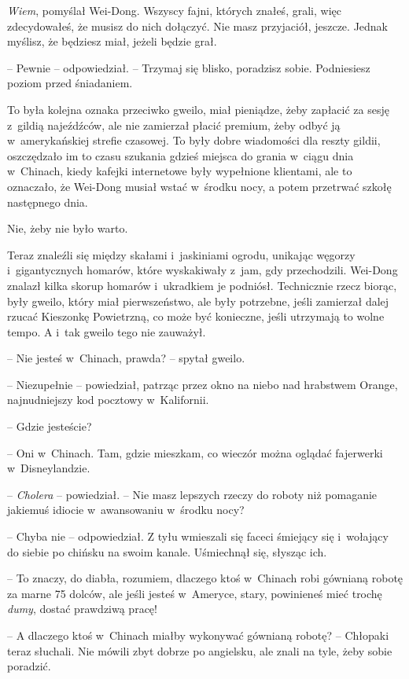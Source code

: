 \documentclass[oneside,polish,11pt,rmheadings]{mwbk}
\begin{document}
\textit{Wiem}, pomyślał Wei-Dong. Wszyscy fajni, których znałeś, grali, więc zdecydowałeś, że musisz do nich dołączyć. Nie masz przyjaciół, jeszcze. Jednak myślisz, że będziesz miał, jeżeli będzie grał. 

-- Pewnie -- odpowiedział. -- Trzymaj się blisko, poradzisz sobie. Podniesiesz poziom przed śniadaniem. 

To była kolejna oznaka przeciwko gweilo, miał pieniądze, żeby zapłacić za sesję z~gildią najeźdźców, ale nie zamierzał płacić premium, żeby odbyć ją w~amerykańskiej strefie czasowej. To były dobre wiadomości dla reszty gildii, oszczędzało im to czasu szukania gdzieś miejsca do grania w~ciągu dnia w~Chinach, kiedy kafejki internetowe były wypełnione klientami, ale to oznaczało, że Wei-Dong musiał wstać w~środku nocy, a potem przetrwać szkołę następnego dnia. 


Nie, żeby nie było warto. 


Teraz znaleźli się między skałami i~jaskiniami ogrodu, unikając węgorzy i~gigantycznych homarów, które wyskakiwały z~jam, gdy przechodzili. Wei-Dong znalazł kilka skorup homarów i~ukradkiem je podniósł. Technicznie rzecz biorąc, były gweilo, który miał pierwszeństwo, ale były potrzebne, jeśli zamierzał dalej rzucać Kieszonkę Powietrzną, co może być konieczne, jeśli utrzymają to wolne tempo. A i~tak gweilo tego nie zauważył.  


-- Nie jesteś w~Chinach, prawda? -- spytał gweilo.  


-- Niezupełnie -- powiedział, patrząc przez okno na niebo nad hrabstwem Orange, najnudniejszy kod pocztowy w~Kalifornii. 

-- Gdzie jesteście?  


-- Oni w~Chinach. Tam, gdzie mieszkam, co wieczór można oglądać fajerwerki w~Disneylandzie.  


-- \textit{Cholera }-- powiedział. -- Nie masz lepszych rzeczy do roboty niż pomaganie jakiemuś idiocie w~awansowaniu w~środku nocy?  


-- Chyba nie -- odpowiedział. Z tyłu wmieszali się faceci śmiejący się i~wołający do siebie po chińsku na swoim kanale. Uśmiechnął się, słysząc ich. 


-- To znaczy, do diabła, rozumiem, dlaczego ktoś w~Chinach robi gównianą robotę za marne 75 dolców, ale jeśli jesteś w~Ameryce, stary, powinieneś mieć trochę \textit{dumy}, dostać prawdziwą pracę! 


-- A dlaczego ktoś w~Chinach miałby wykonywać gównianą robotę? -- Chłopaki teraz słuchali. Nie mówili zbyt dobrze po angielsku, ale znali na tyle, żeby sobie poradzić. 
\end{document}
